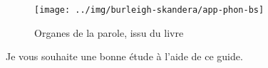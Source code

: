 \begin{center}
  \begin{figure}[h]
    \centering
    \texttt{[image: ../img/burleigh-skandera/app-phon-bs]}
    \caption{Organes de la parole, issu du livre \bs}
    \label{fig:app-phon}
  \end{figure}
\end{center}

Je vous souhaite une bonne étude à l'aide de ce guide.

\newpage
\minitoc
